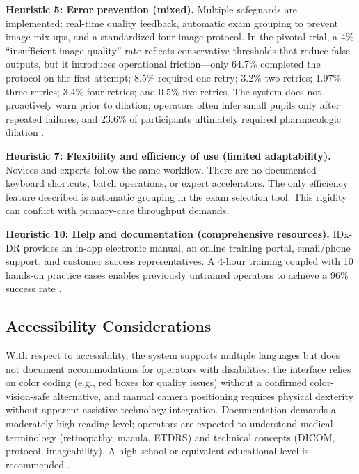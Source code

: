 \documentclass[sigconf]{acmart}
\begin{document}
\textbf{Heuristic 5: Error prevention (mixed).} Multiple safeguards are implemented: real\mbox{-}time quality feedback, automatic exam grouping to prevent image mix\mbox{-}ups, and a standardized four\mbox{-}image protocol. In the pivotal trial, a 4\% “insufficient image quality” rate reflects conservative thresholds that reduce false outputs, but it introduces operational friction—only 64.7\% completed the protocol on the first attempt; 8.5\% required one retry; 3.2\% two retries; 1.97\% three retries; 3.4\% four retries; and 0.5\% five retries. The system does not proactively warn prior to dilation; operators often infer small pupils only after repeated failures, and 23.6\% of participants ultimately required pharmacologic dilation \citep{Abramoff2018Pivotal}.

\textbf{Heuristic 7: Flexibility and efficiency of use (limited adaptability).} Novices and experts follow the same workflow. There are no documented keyboard shortcuts, batch operations, or expert accelerators. The only efficiency feature described is automatic grouping in the exam selection tool. This rigidity can conflict with primary\mbox{-}care throughput demands.

\textbf{Heuristic 10: Help and documentation (comprehensive resources).} IDx\mbox{-}DR provides an in\mbox{-}app electronic manual, an online training portal, email/phone support, and customer success representatives. A 4\mbox{-}hour training coupled with 10 hands\mbox{-}on practice cases enables previously untrained operators to achieve a 96\% success rate \citep{FDA2018DEN180001}.

\subsection{Accessibility Considerations}

With respect to accessibility, the system supports multiple languages but does not document accommodations for operators with disabilities: the interface relies on color coding (e.g., red boxes for quality issues) without a confirmed color\mbox{-}vision\mbox{-}safe alternative, and manual camera positioning requires physical dexterity without apparent assistive technology integration. Documentation demands a moderately high reading level; operators are expected to understand medical terminology (retinopathy, macula, ETDRS) and technical concepts (DICOM, protocol, imageability). A high\mbox{-}school or equivalent educational level is recommended \citep{FDA2018DEN180001}.
\end{document}
